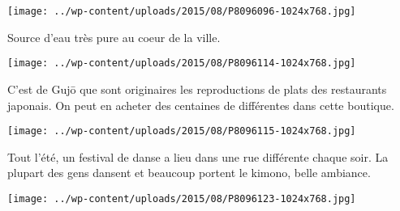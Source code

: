  \newline
 \newline
\centerline{\texttt{[image: ../wp-content/uploads/2015/08/P8096096-1024x768.jpg]} } 
 \newline
 Source d'eau très pure au coeur de la ville. \newline
 \newline
\centerline{\texttt{[image: ../wp-content/uploads/2015/08/P8096114-1024x768.jpg]} } 
 \newline
 C'est de Gujō que sont originaires les reproductions de plats des restaurants japonais. On peut en acheter des centaines de différentes dans cette boutique. \newline
 \newline
\centerline{\texttt{[image: ../wp-content/uploads/2015/08/P8096115-1024x768.jpg]} } 
 \newline
 Tout l'été, un festival de danse a lieu dans une rue différente chaque soir. La plupart des gens dansent et beaucoup portent le kimono, belle ambiance. \newline
 \newline
\centerline{\texttt{[image: ../wp-content/uploads/2015/08/P8096123-1024x768.jpg]} } 
 \newline

\newpage
 
